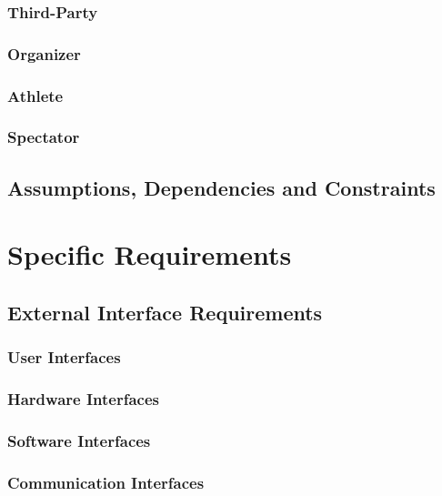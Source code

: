 \documentclass[a4paper]{article}
\begin{document}
        \subsubsection{Third-Party}
        
        \subsubsection{Organizer}
        
        \subsubsection{Athlete}
        
        \subsubsection{Spectator}
        
    \subsection{Assumptions, Dependencies and Constraints}
    
\newpage
\section{Specific Requirements}

    \subsection{External Interface Requirements}
        
        \subsubsection{User Interfaces}
        
        \subsubsection{Hardware Interfaces}
        
        \subsubsection{Software Interfaces}
        
        \subsubsection{Communication Interfaces}
    
\end{document}
